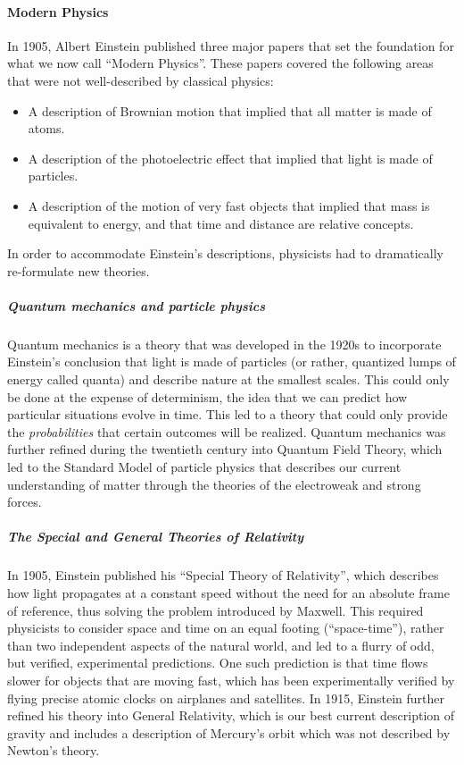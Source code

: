 \paragraph{Modern Physics}

In 1905, Albert Einstein published three major papers that set the foundation for what we now call ``Modern Physics''. These papers covered the following areas that were not well-described by classical physics:

\begin{itemize}
\item A description of Brownian motion that implied that all matter is made of atoms.
\item A description of the photoelectric effect that implied that light is made of particles.
\item A description of the motion of very fast objects that implied that mass is equivalent to energy, and that time and distance are relative concepts.
\end{itemize}

In order to accommodate Einstein's descriptions, physicists had to dramatically re-formulate new theories.

\subparagraph{Quantum mechanics and particle physics}

Quantum mechanics is a theory that was developed in the 1920s to incorporate Einstein's conclusion that light is made of particles (or rather, quantized lumps of energy called quanta) and describe nature at the smallest scales. This could only be done at the expense of determinism, the idea that we can predict how particular situations evolve in time. This led to a theory that could only provide the \textit{probabilities} that certain outcomes will be realized. Quantum mechanics was further refined during the twentieth century into Quantum Field Theory, which led to the Standard Model of particle physics that describes our current understanding of matter through the theories of the electroweak and strong forces.

\subparagraph{The Special and General Theories of Relativity}

In 1905, Einstein published his ``Special Theory of Relativity'', which describes how light propagates at a constant speed without the need for an absolute frame of reference, thus solving the problem introduced by Maxwell. This required physicists to consider space and time on an equal footing (``space-time''), rather than two independent aspects of the natural world, and led to a flurry of odd, but verified, experimental predictions. One such prediction is that time flows slower for objects that are moving fast, which has been experimentally verified by flying precise atomic clocks on airplanes and satellites. In 1915, Einstein further refined his theory into General Relativity, which is our best current description of gravity and includes a description of Mercury's orbit which was not described by Newton's theory.

